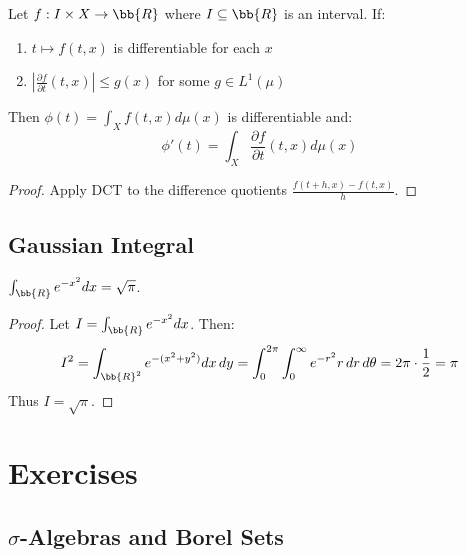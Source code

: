 \begin{theorem}
Let $f: I \times X \to \bb{R}$ where $I \subseteq \bb{R}$ is an interval. If:
\begin{enumerate}
    \item $t \mapsto f(t, x)$ is differentiable for each $x$
    \item $|\frac{\partial f}{\partial t}(t, x)| \leq g(x)$ for some $g \in L^1(\mu)$
\end{enumerate}
Then $\phi(t) = \int_X f(t, x) d\mu(x)$ is differentiable and:
\[ \phi'(t) = \int_X \frac{\partial f}{\partial t}(t, x) d\mu(x) \]
\end{theorem}

\begin{proof}
Apply DCT to the difference quotients $\frac{f(t+h, x) - f(t, x)}{h}$.
\end{proof}

\section{Gaussian Integral}

\begin{theorem}
$\int_{\bb{R}} e^{-x^2} dx = \sqrt{\pi}$.
\end{theorem}

\begin{proof}
Let $I = \int_\bb{R} e^{-x^2} dx$. Then:
\[ I^2 = \int_{\bb{R}^2} e^{-(x^2+y^2)} dx\,dy = \int_0^{2\pi} \int_0^\infty e^{-r^2} r\,dr\,d\theta = 2\pi \cdot \frac{1}{2} = \pi \]
Thus $I = \sqrt{\pi}$.
\end{proof}


\chapter{Exercises}

\section{$\sigma$-Algebras and Borel Sets}

